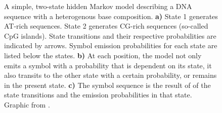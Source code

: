\begin{figure}[t]
	\centering
	\def\svgwidth{\textwidth}
	
	\caption[A simple hidden Markov model]{A simple, two-state hidden Markov model
		describing a DNA sequence with a heterogenous base composition. 
		\textbf{a)} State 1 generates AT-rich sequences. State 2 generates CG-rich
			sequences (so-called CpG islands). State transitions and their respective
			probabilities are indicated by arrows. Symbol emission probabilities for
			each state are listed below the states.
		\textbf{b)} At each position, the model not only emits a symbol with a
			probability that is dependent on its state, it also transits to the
			other state with a certain probability, or remains in the present state.
		\textbf{c)} The symbol sequence is the result of of the state transitions and
			the emission probabilities in that state.
		Graphic from \citet{eddy1996}.
	}
	\label{fig:hmm}
\end{figure}

